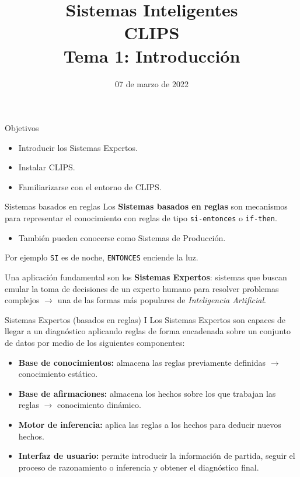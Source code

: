 \documentclass[usenames,dvipsnames,aspectratio=169]{beamer}
\title[N-Reinas]{{\LARGE Sistemas Inteligentes\\CLIPS}\\[0.5cm]Tema 1: Introducción}
\date[Marzo, 2022]{07 de marzo de 2022}
\author[A. Esteban]{\texorpdfstring{
    \begin{minipage}{0.47\linewidth}
        Aurora Esteban Toscano
        \pdfnewline
        \texttt{aestebant@uco.es}
    \end{minipage}
}{Aurora Esteban Toscano}
}
\institute{Grado en Ingeniería Informática, Universidad de Córdoba}
\begin{document}

\begin{frame}
\titlepage
\end{frame}

\begin{frame}{Objetivos}
	\begin{itemize}
		\item Introducir los Sistemas Expertos.
		\item Instalar CLIPS.
		\item Familiarizarse con el entorno de CLIPS.
	\end{itemize}
\end{frame}

\begin{frame}{Sistemas basados en reglas}
Los \textbf{Sistemas basados en reglas} son mecanismos para representar el conocimiento con reglas de tipo \texttt{si-entonces} o \texttt{if-then}.
\begin{itemize}
	\item También pueden conocerse como Sistemas de Producción.
\end{itemize}
\begin{exampleblock}{Por ejemplo}
	\texttt{SI} es de noche, \texttt{ENTONCES} enciende la luz.
\end{exampleblock}
Una aplicación fundamental son los \textbf{Sistemas Expertos}: sistemas que buscan emular la toma de decisiones de un experto humano para resolver problemas complejos $\rightarrow$ una de las formas más populares de \textit{Inteligencia Artificial}.
\end{frame}

\begin{frame}{Sistemas Expertos (basados en reglas) I}
	Los Sistemas Expertos son capaces de llegar a un diagnóstico aplicando reglas de forma encadenada sobre un conjunto de datos por medio de los siguientes componentes:
	\begin{itemize}
		\item \textbf{Base de conocimientos:} almacena las reglas previamente definidas $\rightarrow$ conocimiento estático.
		\item \textbf{Base de afirmaciones:} almacena los hechos sobre los que trabajan las reglas $\rightarrow$ conocimiento dinámico.
		\item \textbf{Motor de inferencia:} aplica las reglas a los hechos para deducir nuevos hechos.
		\item \textbf{Interfaz de usuario:} permite introducir la información de partida, seguir el proceso de razonamiento o inferencia y obtener el diagnóstico final.
	\end{itemize}
\end{frame}
\end{document}
